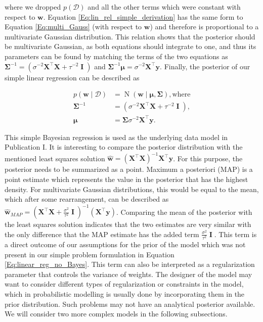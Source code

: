 \documentclass[dissertation,math,vertlayout,pdfa,colorlinks]{aaltoseries}
\newcommand{\bw}{\bm{w}}
\newcommand{\bX}{\bm{X}}
\newcommand{\by}{\bm{y}}
\newcommand{\bD}{\mathcal{D}}
\DeclareMathOperator{\eye}{\textbf{I}}
\DeclareMathOperator{\normalpdf}{N}
\newcommand{\tp}{^{\top}}
\begin{document}
\noindent where we dropped $p(\bD)$ and all the other terms which were constant with respect to $\bw$. Equation \ref{Eq:lin_rel_simple_derivation} has the same form to Equation \ref{Eq:multi_Gauss} (with respect to $\bw$) and therefore is proportional to a multivariate Gaussian distribution. This relation shows that the posterior should be multivariate Gaussian, as both equations should integrate to one, and thus its parameters can be found by matching the terms of the two equations as $\bm{\Sigma}^{-1} = ( \sigma^{-2}\bX\tp\bX + \tau^{-2} \eye ) $ and $\bm{\Sigma}^{-1}\bm{\mu} = \sigma^{-2}\bX\tp\by$. Finally, the posterior of our simple linear regression can be described as 

\begin{align}\label{Eq:lin_rel_simple_posterior}
	p(\bw \mid \bD) &= \normalpdf(\bw \mid \bm{\mu},\bm{\Sigma}), \text{where}\\
	\bm{\Sigma}^{-1} &= (\sigma^{-2}\bX\tp\bX + \tau^{-2} \eye ), \nonumber\\
	\bm{\mu} &= \bm{\Sigma}\sigma^{-2}\bX\tp\by. \nonumber
\end{align}

This simple Bayesian regression is used as the underlying data model in Publication I. It is interesting to compare the posterior distribution with the mentioned least squares solution $\hat{\bw} = (\bX \tp \bX)^{-1}\bX\tp \by$. For this purpose, the posterior needs to be summarized as a point. Maximum a posteriori (MAP) is a point estimate which represents the value in the posterior that has the highest density. For multivariate Gaussian distributions, this would be equal to the mean, which after some rearrangement, can be described as $\hat{\bw}_{MAP} = (\bX\tp\bX + \frac{\sigma^{2}}{\tau^{2}} \eye )^{-1}(\bX\tp\by)$. Comparing the mean of the posterior with the least squares solution indicates that the two estimates are very similar with the only difference that the MAP estimate has the added term $\frac{\sigma^{2}}{\tau^{2}} \eye$. This term is a direct outcome of our assumptions for the prior of the model which was not present in our simple problem formulation in Equation \ref{Eq:linear_reg_no_Bayes}. This term can also be interpreted as a regularization parameter that controls the variance of weights. The designer of the model may want to consider different types of regularization or constraints in the model, which in probabilistic modelling is usually done by incorporating them in the prior distribution. Such problems may not have an analytical posterior available. We will consider two more complex models in the following subsections.
\end{document}
